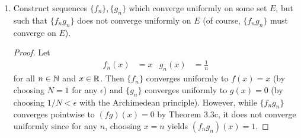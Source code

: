 \documentclass[../psets.tex]{subfiles}
\begin{document}
\begin{enumerate}[label={\textbf{\arabic*.}}]
\begin{proof}
        \begin{align*}
            |(f_n+g_n)(x)-(f+g)(x)| &= |f_n(x)-f(x)+g_n(x)-g(x)|\\
            &\leq |f_n(x)-f(x)|+|g_n(x)-g(x)|\\
            &< \frac{\epsilon}{2}+\frac{\epsilon}{2}\\
            &= \epsilon
        \end{align*}
        as desired.\par
        To prove that $\{f_ng_n\}$ converges uniformly on $E$ to $fg$, it will suffice to show that for all $\epsilon>0$, there exists an $N$ such that if $n\geq N$, then $|(f_ng_n)(x)-(fg)(x)|<\epsilon$ for all $x\in E$. Let $\epsilon>0$ be arbitrary. Since $f_n,g_n$ are uniformly convergent sequences of bounded functions, Exercise 1 implies that they are uniformly bounded, i.e., there exists $M^f,M^g\in\R$ such that $|f_n|<M^f$ and $|g_n|<M^g$ for all $n\in\N$. If we take $M=\max(M^f,M^g)$, then we have $|f_n|<M$ and $|g_n|<M$ for all $n\in\N$. Note that the same inequality holds for $f$ and $g$. Now, as before, we may pick $N$ such that if $n\geq N$, then $|f_n(x)-f(x)|<\epsilon/2M$ and $|g_n(x)-g(x)|<\epsilon/2M$ for all $x\in E$. It follows that for any $n\geq N$ and $x\in E$,
        \begin{align*}
            |(f_ng_n)(x)-(fg)(x)| &= |f_n(x)\cdot(g_n(x)-g(x))+g(x)\cdot(f_n(x)-f(x))|\\
            &= |f_n(x)|\cdot|g_n(x)-g(x)|+|g(x)|\cdot|f_n(x)-f(x)|\\
            &< M\cdot\frac{\epsilon}{2M}+M\cdot\frac{\epsilon}{2M}\\
            &= \epsilon
        \end{align*}
        as desired.
    \end{proof}
    \item Construct sequences $\{f_n\},\{g_n\}$ which converge uniformly on some set $E$, but such that $\{f_ng_n\}$ does not converge uniformly on $E$ (of course, $\{f_ng_n\}$ must converge on $E$).
    \begin{proof}
        Let
        \begin{align*}
            f_n(x) &= x&
            g_n(x) &= \frac{1}{n}
        \end{align*}
        for all $n\in\N$ and $x\in\mathbb{R}$. Then $\{f_n\}$ converges uniformly to $f(x)=x$ (by choosing $N=1$ for any $\epsilon$) and $\{g_n\}$ converges uniformly to $g(x)=0$ (by choosing $1/N<\epsilon$ with the Archimedean principle). However, while $\{f_ng_n\}$ converges pointwise to $(fg)(x)=0$ by Theorem 3.3c, it does not converge uniformly since for any $n$, choosing $x=n$ yields $(f_ng_n)(x)=1$.

\end{proof}
\end{enumerate}
\end{document}
